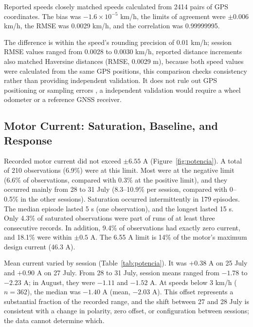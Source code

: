 \documentclass[vehicles,article,submit,moreauthors]{Definitions/mdpi}
\begin{document}
Reported speeds closely matched speeds calculated from 2414 pairs of GPS coordinates. The bias was $-1.6\times10^{-5}$ km/h, the limits of agreement were $\pm 0.006$ km/h, the RMSE was 0.0029 km/h, and the correlation was 0.99999995.

The difference is within the speed's rounding precision of 0.01 km/h; session RMSE values ranged from 0.0028 to 0.0030 km/h, reported distance increments also matched Haversine distances (RMSE, 0.0029 m), because both speed values were calculated from the same GPS positions, this comparison checks consistency rather than providing independent validation. It does not rule out GPS positioning or sampling errors \citep{ref-schuessler,ref-zandbergen}, a independent validation would require a wheel odometer or a reference GNSS receiver.

\subsection{Motor Current: Saturation, Baseline, and Response}

Recorded motor current did not exceed $\pm 6.55$ A (Figure~\ref{fig:potencia}). A total of 210 observations (6.9\%) were at this limit. Most were at the negative limit (6.6\% of observations, compared with 0.3\% at the positive limit), and they occurred mainly from 28 to 31 July (8.3--10.9\% per session, compared with 0--0.5\% in the other sessions). Saturation occurred intermittently in 179 episodes. The median episode lasted 5 s (one observation), and the longest lasted 15 s. Only 4.3\% of saturated observations were part of runs of at least three consecutive records. In addition, 9.4\% of observations had exactly zero current, and 18.1\% were within $\pm 0.5$ A. The 6.55 A limit is 14\% of the motor's maximum design current (46.3 A).

Mean current varied by session (Table~\ref{tab:potencia}). It was $+0.38$ A on 25 July and $+0.90$ A on 27 July. From 28 to 31 July, session means ranged from $-1.78$ to $-2.23$ A; in August, they were $-1.11$ and $-1.52$ A. At speeds below 3 km/h ($n=362$), the median was $-1.40$ A (mean, $-2.03$ A). This offset represents a substantial fraction of the recorded range, and the shift between 27 and 28 July is consistent with a change in polarity, zero offset, or configuration between sessions; the data cannot determine which.
\end{document}
